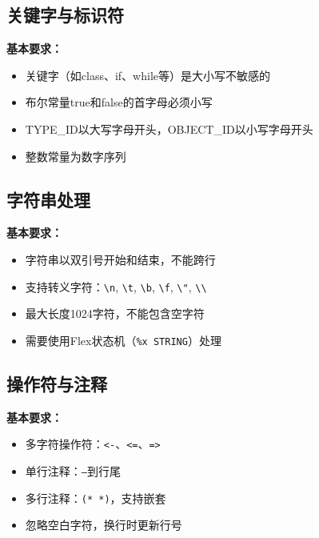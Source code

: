 \documentclass[twocolumn]{article}
\begin{document}
\subsection{关键字与标识符}

\textbf{基本要求：}
\begin{itemize}
    \item 关键字（如class、if、while等）是大小写不敏感的
    \item 布尔常量true和false的首字母必须小写
    \item TYPE\_ID以大写字母开头，OBJECT\_ID以小写字母开头
    \item 整数常量为数字序列
\end{itemize}

\textcolor{red}{%
}


\subsection{字符串处理}

\textbf{基本要求：}
\begin{itemize}
    \item 字符串以双引号开始和结束，不能跨行
    \item 支持转义字符：\texttt{\textbackslash n}, \texttt{\textbackslash t}, \texttt{\textbackslash b}, \texttt{\textbackslash f}, \texttt{\textbackslash"}, \texttt{\textbackslash\textbackslash}
    \item 最大长度1024字符，不能包含空字符
    \item 需要使用Flex状态机（\texttt{\%x STRING}）处理
\end{itemize}

\textcolor{red}{%
}

\subsection{操作符与注释}

\textbf{基本要求：}
\begin{itemize}
    \item 多字符操作符：\texttt{<-}、\texttt{<=}、\texttt{=>}
    \item 单行注释：\texttt{--}到行尾
    \item 多行注释：\texttt{(* *)}，支持嵌套
    \item 忽略空白字符，换行时更新行号
\end{itemize}
\end{document}
